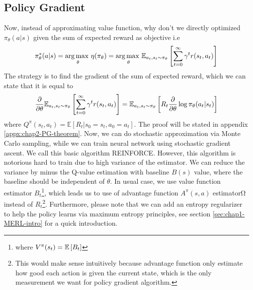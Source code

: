 \subsection{Policy Gradient \cite{sutton2000policy}}
Now, instead of approximating value function, why don't we directly optimized $\pi_\theta(a | s)$ given the sum of expected reward as objective i.e 
\begin{equation}
    \pi_\theta^*(a | s) = \underset{\theta}{\arg\max \ } \eta(\pi_\theta) = \underset{\theta}{\arg\max \ }\mathbb{E}_{a_t, s_t \sim \pi_\theta}\left[ \sum^\infty_{t=0}\gamma^t r(s_t, a_t) \right]
\end{equation}
The strategy is to find the gradient of the sum of expected reward, which we can state that it is equal to
\begin{equation}
    \frac{\partial}{\partial \theta} \mathbb{E}_{a_t, s_t \sim \pi_\theta}\left[ \sum^\infty_{t=0}\gamma^t r(s_t, a_t) \right] = \mathbb{E}_{a_t, s_t \sim \pi_\theta}\left[ R_t\frac{\partial}{\partial \theta} \log \pi_\theta(a_t | s_t)  \right]
\end{equation}
where $Q^\pi(s_t, a_t) = \mathbb{E}\left[R_t | s_0 = s_t, a_0 = a_t\right]$. The proof will be stated in appendix \ref{appx:chap2-PG-theorem}. Now, we can do stochastic approximation via Monte Carlo sampling, while we can train neural network using stochastic gradient ascent. We call this basic algorithm REINFORCE. However, this algorithm is notorious hard to train due to high variance of the estimator. We can reduce the variance by minus the Q-value estimation with baseline $B(s)$ value, where the baseline should be independent of $\theta$. In usual case, we use value function estimator $B_t$\footnote{where $V^\pi(s_t) = \mathbb{E}\left[ B_t \right]$}, which leads us to use of advantage function $A^\pi(s, a)$ estimatorΩ instead of $R_t$\footnote{This would make sense intuitively because advantage function only estimate how good each action is given the current state, which is the only measurement we want for policy gradient algorithm.}. Furthermore, please note that we can add an entropy regularizer to help the policy learns via maximum entropy principles, see section \ref{sec:chap1-MERL-intro} for a quick introduction.

